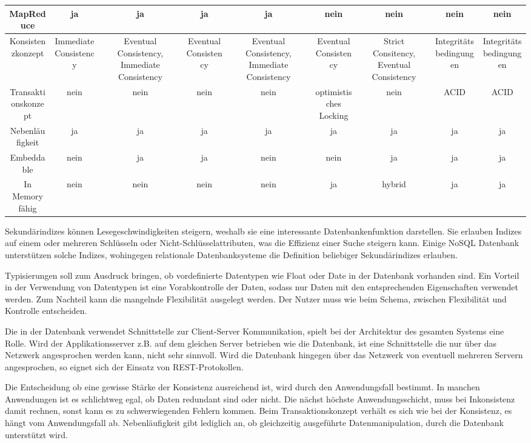 \begin{table}[H]
\begin{tabulary} {\linewidth} {C | C | C | C | C | C | C | C | C}
\midrule
MapReduce & ja & ja & ja & ja & nein & nein & nein & nein \\
\midrule
Konsistenzkonzept & Immediate Consistency & Eventual Consistency, Immediate Consistency & Eventual
Consistency & Eventual Consistency, Immediate Consistency & Eventual Consistency & Strict Consitency, Eventual Consistency &  Integritätsbedingungen & Integritätsbedingungen \\
\midrule
Transaktionskonzept & nein & nein & nein & nein & optimistisches Locking & nein & ACID & ACID \\
\midrule
Nebenläufigkeit & ja & ja & ja & ja & ja & ja & ja & ja \\
\midrule
Embeddable & nein & ja & ja & nein & nein & ja & ja & ja \\
\midrule
In Memory fähig & nein & nein & nein & nein & ja & hybrid & ja & ja \\
\bottomrule
\end{tabulary}
\end{table}

Sekundärindizes können Lesegeschwindigkeiten steigern, weshalb sie eine interessante Datenbankenfunktion darstellen. Sie erlauben Indizes auf einem oder mehreren Schlüsseln oder Nicht-Schlüsselattributen, was die Effizienz einer Suche steigern kann. Einige NoSQL Datenbank unterstützen solche Indizes, wohingegen relationale Datenbanksysteme die Definition beliebiger Sekundärindizes erlauben. 

Typisierungen soll zum Ausdruck bringen, ob vordefinierte Datentypen wie Float oder Date in der Datenbank vorhanden sind. Ein Vorteil in der Verwendung von Datentypen ist eine Vorabkontrolle der Daten, sodass nur Daten mit den entsprechenden Eigenschaften verwendet werden. Zum Nachteil kann die mangelnde Flexibilität ausgelegt werden. Der Nutzer muss wie beim Schema, zwischen Flexibilität und Kontrolle entscheiden. 

Die in der Datenbank verwendet Schnittstelle zur Client-Server Kommunikation, spielt bei der Architektur des gesamten Systems eine Rolle. Wird der Applikationsserver z.B. auf dem gleichen Server betrieben wie die Datenbank, ist eine Schnittstelle die nur über das Netzwerk angesprochen werden kann, nicht sehr sinnvoll. Wird die Datenbank hingegen über das Netzwerk von eventuell mehreren Servern angesprochen, so eignet sich der Einsatz von REST-Protokollen. 

Die Entscheidung ob eine gewisse Stärke der Konsistenz ausreichend ist, wird durch den Anwendungsfall bestimmt. In manchen Anwendungen ist es schlichtweg egal, ob Daten redundant sind oder nicht. Die nächst höchste Anwendungsschicht, muss bei Inkonsistenz damit rechnen, sonst kann es zu schwerwiegenden Fehlern kommen. Beim Transaktionskonzept verhält es sich wie bei der Konsistenz, es hängt vom Anwendungsfall ab. Nebenläufigkeit gibt lediglich an, ob gleichzeitig ausgeführte Datenmanipulation, durch die Datenbank unterstützt wird.   

